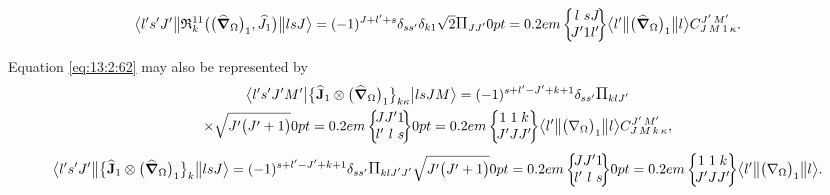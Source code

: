 \begin{equation*}
\braOketred{ l^{\prime} s^{\prime} J^{\prime}}{ \mathfrak{R}_{k }^{11}\bigl(\bigl(\delop_{\Omega}\bigr)_{1}, \widehat{J}_{1}\bigr)}{l s J}=(-1)^{J+l^{\prime}+s} \delta_{s s^{\prime}} \delta_{k 1} \sqrt{2}\Fact{J J^{\prime}}
\sixj{l}{s}{J}{J^{\prime}}{1}{l^{\prime}}
\braOketred{ l^{\prime}}{\bigl(\delop_{\Omega}\bigr)_{1}}{ l} 
\clebsch{J}{M}{1}{\kappa}{J^{\prime}}{M^{\prime}}. 
\end{equation*}

Equation \eqref{eq:13:2:62} may also be represented by
\begin{multline}
\braOket{ l^{\prime} s^{\prime} J^{\prime} M^{\prime}}{\bigl\{\widehat{\vect{J}}_{1} \otimes\bigl(\delop_{\Omega}\bigr)_{1}\bigr\}_{k \kappa}}{l s J M}=(-1)^{s+l^{\prime}-J^{\prime}+k+1} \delta_{s s^{\prime}} \Fact{k l J^{\prime}} \\
 \times \sqrt{J^{\prime}\bigl(J^{\prime}+1\bigr)}
\sixj{J}{J^{\prime}}{1}{l^{\prime}}{l}{s}
\sixj{1}{1}{k}{J^{\prime}}{J}{J^{\prime}}
\braOketred{ l^{\prime}}{\bigl(\nabla_{\Omega}\bigr)_{1}}{ l}
\clebsch{J}{M}{k}{\kappa}{J^{\prime}}{M^{\prime}}, \label{eq:13:2:65}
\end{multline}
\begin{multline*}
\braOketred{ l^{\prime} s^{\prime} J^{\prime}}{\bigl\{\widehat{\vect{J}}_{1} \otimes\bigl(\delop_{\Omega}\bigr)_{1}\bigr\}_{k}}{l s J}=(-1)^{s+l^{\prime}-J^{\prime}+k+1} \delta_{s s^{\prime}} \Fact{k l J^{\prime} J^{\prime}} \sqrt{J^{\prime}\bigl(J^{\prime}+1\bigr)}
\sixj{J}{J^{\prime}}{1}{l^{\prime}}{l}{s}
\sixj{1}{1}{k}{J^{\prime}}{J}{J^{\prime}}
\braOketred{ l^{\prime}}{\bigl(\nabla_{\Omega}\bigr)_{1}}{ l} .
\end{multline*}

